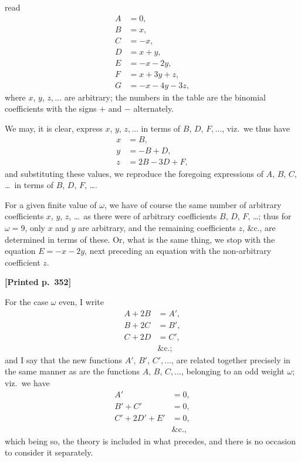 \documentclass[11pt]{article}
\begin{document}
\medskip

\noindent read
\begin{align*}
A &= 0, \\
B &= x, \\
C &= -x, \\
D &= x + y, \\
E &= -x - 2y, \\
F &= x + 3y + z, \\
G &= -x - 4y - 3z,
\end{align*}
where $x$, $y$, $z, \dots$ are arbitrary; the numbers in the table are the binomial coefficients with the signs $+$ and $-$ alternately.

We may, it is clear, express $x$, $y$, $z, \dots$ in terms of $B$, $D$, $F, \dots$, viz.\ we thus have
\begin{align*}
x &= B, \\
y &= -B + D, \\
z &= 2B - 3D + F,
\end{align*}
and substituting these values, we reproduce the foregoing expressions of $A$, $B$, $C$, \dots\ in terms of $B$, $D$, $F$, \dots.

For a given finite value of $\omega$, we have of course the same number of arbitrary coefficients $x$, $y$, $z$, \dots\ as there were of arbitrary coefficients $B$, $D$, $F$, \dots; thus for $\omega = 9$, only $x$ and $y$ are arbitrary, and the remaining coefficients $z$, \&c., are determined in terms of these. Or, what is the same thing, we stop with the equation $E = -x - 2y$, next preceding an equation with the non-arbitrary coefficient $z$.

\medskip

\noindent\textbf{[Printed p.~352]}\hfill

For the case $\omega$ even, I write
\begin{align*}
A + 2B &= A', \\
B + 2C &= B', \\
C + 2D &= C', \\
&\text{\&c.;}
\end{align*}
and I say that the new functions $A'$, $B'$, $C', \dots$, are related together precisely in the same manner as are the functions $A$, $B$, $C, \dots$, belonging to an odd weight $\omega$; viz.\ we have
\begin{align*}
A' &= 0, \\
B' + C' &= 0, \\
C' + 2D' + E' &= 0, \\
&\text{\&c.,}
\end{align*}
which being so, the theory is included in what precedes, and there is no occasion to consider it separately.
\end{document}
